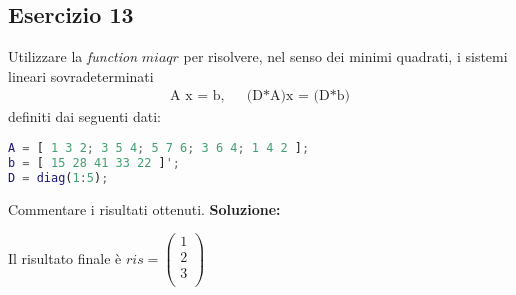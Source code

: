 \subsection{Esercizio 13}
Utilizzare la \textit{function} $miaqr$ per risolvere, nel senso dei minimi quadrati,
i sistemi lineari sovradeterminati
\begin{eqnarray*}
    \mbox{A x = b,} & & \mbox{(D*A)x = (D*b)}
\end{eqnarray*}
definiti dai seguenti dati:
\begin{lstlisting}[language=Matlab]
A = [ 1 3 2; 3 5 4; 5 7 6; 3 6 4; 1 4 2 ];
b = [ 15 28 41 33 22 ]';
D = diag(1:5);
\end{lstlisting}
Commentare i risultati ottenuti.
\newline \textbf{Soluzione:} \newline

Il risultato finale è $ ris =\left(\begin{array}{c}
    1 \\
    2 \\
    3 \\
\end{array}\right)$  

